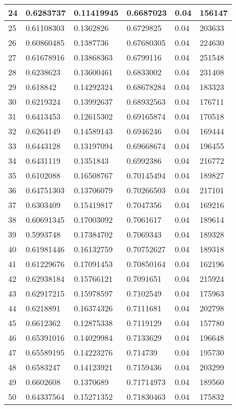 \begin{longtable}{|l|l|l|l|l|l|}
24 & 0.6283737 & 0.11419945 & 0.6687023 & 0.04 & 156147 \\ \hline 
25 & 0.61108303 & 0.1362826 & 0.6729825 & 0.04 & 203633 \\ \hline 
26 & 0.60860485 & 0.1387736 & 0.67680305 & 0.04 & 224630 \\ \hline 
27 & 0.61678916 & 0.13868363 & 0.6799116 & 0.04 & 251548 \\ \hline 
28 & 0.6238623 & 0.13600461 & 0.6833002 & 0.04 & 231408 \\ \hline 
29 & 0.618842 & 0.14292324 & 0.68678284 & 0.04 & 183323 \\ \hline 
30 & 0.6219324 & 0.13992637 & 0.68932563 & 0.04 & 176711 \\ \hline 
31 & 0.6413453 & 0.12615302 & 0.69165874 & 0.04 & 170518 \\ \hline 
32 & 0.6264149 & 0.14589143 & 0.6946246 & 0.04 & 169444 \\ \hline 
33 & 0.6443128 & 0.13197094 & 0.69668674 & 0.04 & 196455 \\ \hline 
34 & 0.6431119 & 0.1351843 & 0.6992386 & 0.04 & 216772 \\ \hline 
35 & 0.6102088 & 0.16508767 & 0.70145494 & 0.04 & 189827 \\ \hline 
36 & 0.64751303 & 0.13706079 & 0.70266503 & 0.04 & 217101 \\ \hline 
37 & 0.6303409 & 0.15419817 & 0.7047356 & 0.04 & 169216 \\ \hline 
38 & 0.60691345 & 0.17003092 & 0.7061617 & 0.04 & 189614 \\ \hline 
39 & 0.5993748 & 0.17384702 & 0.7069343 & 0.04 & 189328 \\ \hline 
40 & 0.61981446 & 0.16132759 & 0.70752627 & 0.04 & 189318 \\ \hline 
41 & 0.61229676 & 0.17091453 & 0.70850164 & 0.04 & 162196 \\ \hline 
42 & 0.62938184 & 0.15766121 & 0.7091651 & 0.04 & 215924 \\ \hline 
43 & 0.62917215 & 0.15978597 & 0.7102549 & 0.04 & 175963 \\ \hline 
44 & 0.6218891 & 0.16374326 & 0.7111681 & 0.04 & 202798 \\ \hline 
45 & 0.6612362 & 0.12875338 & 0.7119129 & 0.04 & 157780 \\ \hline 
46 & 0.65391016 & 0.14029984 & 0.7133629 & 0.04 & 196648 \\ \hline 
47 & 0.65589195 & 0.14223276 & 0.714739 & 0.04 & 195730 \\ \hline 
48 & 0.6583247 & 0.14123921 & 0.7159436 & 0.04 & 203299 \\ \hline 
49 & 0.6602608 & 0.1370689 & 0.71714973 & 0.04 & 189560 \\ \hline 
50 & 0.64337564 & 0.15271352 & 0.71830463 & 0.04 & 175832 \\ \hline 
\end{longtable}